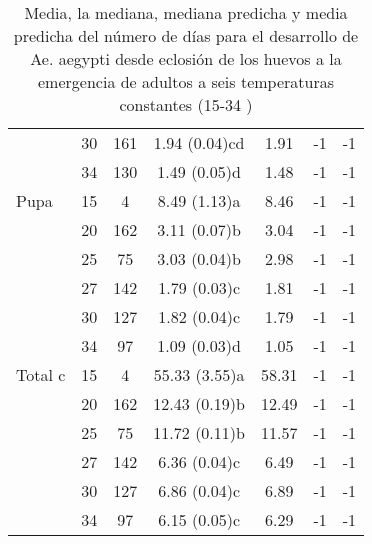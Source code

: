 \begin{table}
\begin{center}
\begin{tabular}{p{2cm} c c c c c c }
             & 30 & 161 & 1.94 (0.04)cd & 1.91  & -1 & -1\\ 
             & 34 & 130 & 1.49 (0.05)d  & 1.48  & -1 & -1\\ 
Pupa         & 15 & 4   & 8.49 (1.13)a  & 8.46  & -1 & -1\\ 
             & 20 & 162 & 3.11 (0.07)b  & 3.04  & -1 & -1\\ 
             & 25 & 75  & 3.03 (0.04)b  & 2.98  & -1 & -1\\ 
             & 27 & 142 & 1.79 (0.03)c  & 1.81  & -1 & -1\\  
             & 30 & 127 & 1.82 (0.04)c  & 1.79  & -1 & -1\\ 
             & 34 & 97  & 1.09 (0.03)d  & 1.05  & -1 & -1\\ 
Total c      & 15 & 4   & 55.33 (3.55)a & 58.31 & -1 & -1\\ 
             & 20 & 162 & 12.43 (0.19)b & 12.49 & -1 & -1\\ 
             & 25 & 75  & 11.72 (0.11)b & 11.57 & -1 & -1\\ 
             & 27 & 142 & 6.36 (0.04)c  & 6.49  & -1 & -1\\ 
             & 30 & 127 & 6.86 (0.04)c  & 6.89  & -1 & -1\\ 
             & 34 & 97  & 6.15 (0.05)c  & 6.29  & -1 & -1\\ 
\end{tabular}
\caption{ \label{tab:desarrollo-ciclo-temp-test} Media, la mediana, mediana predicha y media predicha
del número de días para el desarrollo de Ae. aegypti desde eclosión de los huevos a la emergencia de
adultos a seis temperaturas constantes (15-34 \textcelsius) \cite{rueda1990temperature}}
\end{center}
\end{table}
